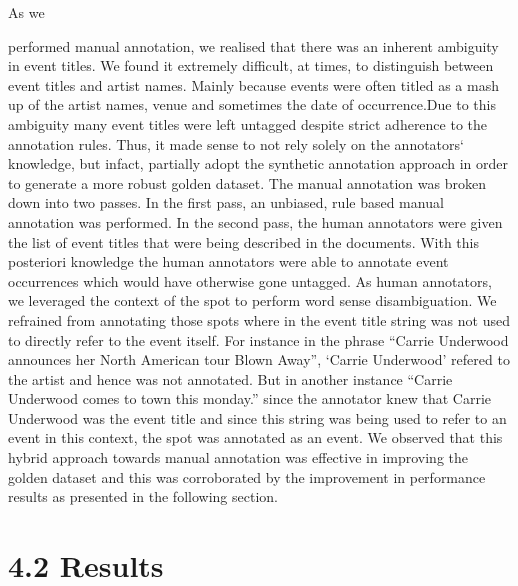 \documentclass[a4paper,11pt]{report}
\begin{document}
	As we performed manual annotation, we realised that there was an inherent ambiguity in event titles. We found it extremely difficult, at times, to distinguish between event titles and artist names. Mainly because events were often titled as a mash up of the artist names, venue and sometimes the date of occurrence.Due to this ambiguity many event titles were left untagged despite strict adherence to the annotation rules. Thus, it made sense to not rely solely on the annotators` knowledge, but infact, partially adopt the synthetic annotation approach in order to generate a more robust golden dataset. The manual annotation was broken down into two passes. In the first pass, an unbiased, rule based manual annotation was performed. In the second pass, the human annotators were given the list of event titles that were being described in the documents. With this  posteriori knowledge the human annotators were able to annotate event occurrences which would have otherwise gone untagged. As human annotators, we leveraged the context of the spot to perform word sense disambiguation. We refrained from annotating those spots where in the event title string was not used to directly refer to the event itself. For instance in the phrase ``Carrie Underwood announces her North American tour Blown Away'', `Carrie Underwood' refered to the artist and hence was not annotated. But in another instance ``Carrie Underwood comes to town this monday.'' since the annotator knew that Carrie
Underwood was the event title and since this string was being used to refer to an
event in this context, the spot was annotated as an event. We observed that this hybrid approach towards manual annotation was effective in improving the golden dataset and this was corroborated by the improvement in performance results as presented in the following section. 

\section*{4.2 Results}
\end{document}
